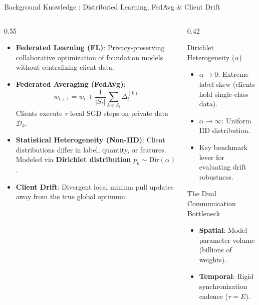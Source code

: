 \documentclass[aspectratio=169]{beamer}
\begin{document}
\begin{frame}{Background Knowledge : Distributed Learning, FedAvg \& Client Drift}
    \vspace{-0.3em}
    \begin{columns}
        \begin{column}{0.55\textwidth}
            \begin{itemize}
                \footnotesize
                \item \textbf{Federated Learning (FL)}: Privacy-preserving collaborative optimization of foundation models without centralizing client data.
                \item \textbf{Federated Averaging (FedAvg)}:
                {\small $$w_{t+1} = w_t + \frac{1}{|S_t|} \sum_{k \in S_t} \Delta_t^{(k)}$$}
                Clients execute $\tau$ local SGD steps on private data $\mathcal{D}_k$.
                \item \textbf{Statistical Heterogeneity (Non-IID)}:
                Client distributions differ in label, quantity, or features. Modeled via \textbf{Dirichlet distribution} $p_k \sim \text{Dir}(\alpha)$.
                \item \textbf{Client Drift}: Divergent local minima pull updates away from the true global optimum.
            \end{itemize}
        \end{column}
        \begin{column}{0.42\textwidth}
            \begin{block}{Dirichlet Heterogeneity ($\alpha$)}
                \footnotesize
                \begin{itemize}
                    \item $\alpha \to 0$: Extreme label skew (clients hold single-class data).
                    \item $\alpha \to \infty$: Uniform IID distribution.
                    \item Key benchmark lever for evaluating drift robustness.
                \end{itemize}
            \end{block}
            \vspace{0.2em}
            \begin{block}{The Dual Communication Bottleneck}
                \footnotesize
                \begin{itemize}
                    \item \textbf{Spatial}: Model parameter volume (billions of weights).
                    \item \textbf{Temporal}: Rigid synchronization cadence ($\tau = E$).
                \end{itemize}
            \end{block}
        \end{column}
    \end{columns}
\end{frame}
\end{document}
